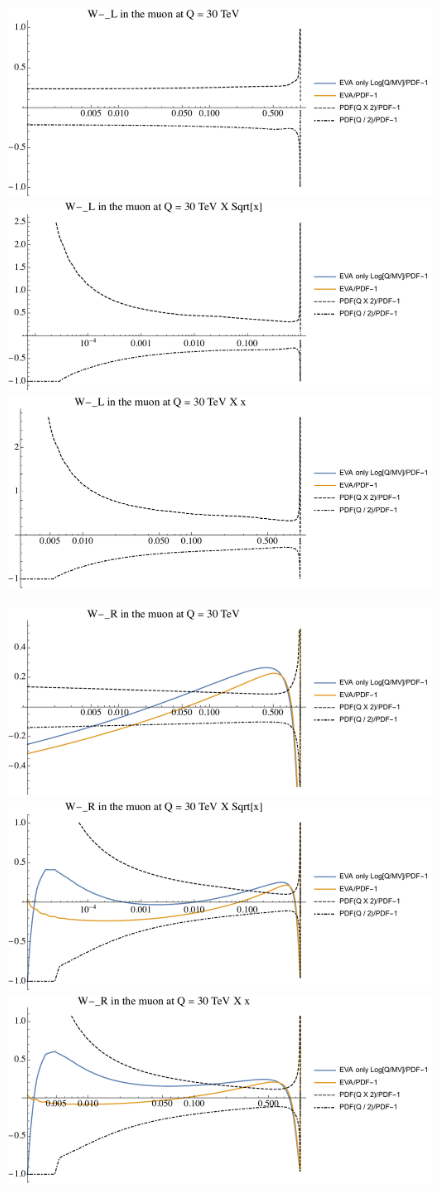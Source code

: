 \documentclass[a4paper,11pt]{article}
\begin{document}
\begin{figure}[ht]
\includegraphics[width=0.4\linewidth]{PlotPDFs/ratios/30TeV/W-_L_Q.pdf}
\includegraphics[width=0.4\linewidth]{PlotPDFs/ratios/30TeV/W-_L_Qsqrtx.pdf}
\includegraphics[width=0.4\linewidth]{PlotPDFs/ratios/30TeV/W-_L_Qx.pdf}
\end{figure}

\begin{figure}[ht]
\includegraphics[width=0.4\linewidth]{PlotPDFs/ratios/30TeV/W-_R_Q.pdf}
\includegraphics[width=0.4\linewidth]{PlotPDFs/ratios/30TeV/W-_R_Qsqrtx.pdf}
\includegraphics[width=0.4\linewidth]{PlotPDFs/ratios/30TeV/W-_R_Qx.pdf}
\end{figure}
\end{document}
